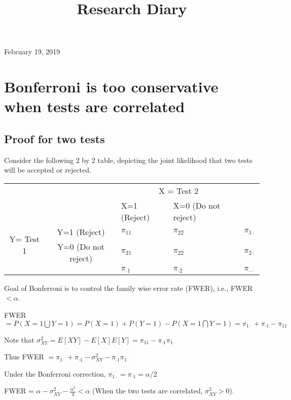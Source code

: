 \documentclass[11pt,letterpaper]{article}
\begin{document}
\univlogo

\title{Research Diary}

{\Huge February 19, 2019}\\[5mm]

\section*{Bonferroni is too conservative when tests are correlated }

\subsection*{Proof for two tests}

Consider the following 2 by 2 table, depicting the joint likelihood that two tests will be accepted or rejected.
\begin{table}[H]
\begin{tabular}{lllll}
 &  & \multicolumn{2}{c}{X = Test 2} &  \\
 &  & X=1 (Reject) & X=0 (Do not reject) &  \\ \cline{3-4}
\multicolumn{1}{c}{\multirow{2}{*}{Y= Test 1}} & \multicolumn{1}{c|}{Y=1 (Reject)} & \multicolumn{1}{l|}{$\pi_{11}$} & \multicolumn{1}{l|}{$\pi_{22}$} & $\pi_{1 \cdot }$ \\ \cline{3-4}
\multicolumn{1}{c}{} & \multicolumn{1}{c|}{Y=0 (Do not reject)} & \multicolumn{1}{l|}{$\pi_{21}$} & \multicolumn{1}{l|}{$\pi_{22}$} & $\pi_{2\cdot}$ \\ \cline{3-4}
 &  & $\pi_{\cdot 1}$ & $\pi_{\cdot 2}$ & $\pi_{\cdot \cdot}$
\end{tabular}
\end{table}

Goal of Bonferroni is to control the family wise error rate (FWER), i.e., FWER$<\alpha$. 

FWER $= P(X=1 \bigcup Y=1) = P(X=1)+P(Y=1)-P(X=1 \bigcap Y=1)=\pi_{1 \cdot}+\pi_{\cdot 1} - \pi_{11}$

Note that $\sigma^2_{XY}=E[XY]-E[X]E[Y]=\pi_{11}-\pi_{\cdot 1}\pi_{1 \cdot}$

Thus FWER $=\pi_{1\cdot}+\pi_{\cdot 1}-\sigma^2_{XY}-\pi_{\cdot 1}\pi_{1 \cdot}$

Under the Bonferroni correction, $\pi_{1 \cdot}=\pi_{ \cdot 1}=\alpha/2$

FWER = $\alpha - \sigma^2_{XY} - \frac{\alpha^2}{4}<\alpha$
(When the two tests are correlated, $\sigma^2_{XY}>0$). 
\end{document}
